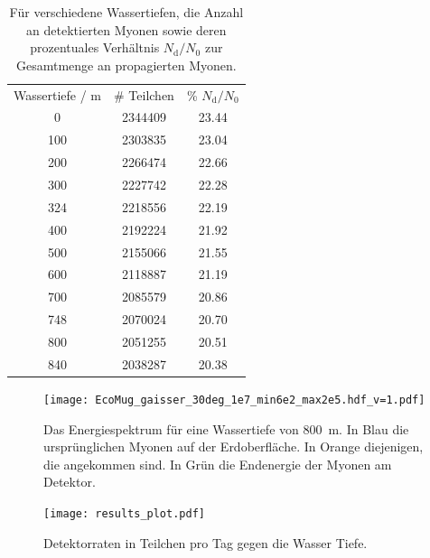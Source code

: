 \begin{table}[h]
    \caption{Für verschiedene Wassertiefen, die Anzahl an detektierten Myonen
     sowie deren prozentuales Verhältnis $N_\mathrm{d}/N_0$ zur Gesamtmenge an propagierten Myonen.}
    \centering\begin{tabular}{c c c}
        Wassertiefe / \si[]{m} & \# Teilchen &  \% $N_\mathrm{d}/N_0$ \\
        0   & \num{2344409} & \num{23.44} \\
        100 & \num{2303835} & \num{23.04} \\
        200 & \num{2266474} & \num{22.66} \\
        300 & \num{2227742} & \num{22.28} \\
        324 & \num{2218556} & \num{22.19} \\
        400 & \num{2192224} & \num{21.92} \\
        500 & \num{2155066} & \num{21.55} \\
        600 & \num{2118887} & \num{21.19} \\
        700 & \num{2085579} & \num{20.86} \\
        748 & \num{2070024} & \num{20.70} \\
        800 & \num{2051255} & \num{20.51} \\
        840 & \num{2038287} & \num{20.38} \\
    \end{tabular}
    \label{tab:wassertiefen_tabelle}
\end{table}

\begin{figure}[]
    \centering
    \texttt{[image: EcoMug\_gaisser\_30deg\_1e7\_min6e2\_max2e5.hdf\_v=1.pdf]}
    \caption{Das Energiespektrum für eine Wassertiefe von \SI[]{800}[]{m}.
        In Blau die ursprünglichen Myonen auf der Erdoberfläche.
        In Orange diejenigen, die angekommen sind. 
        In Grün die Endenergie der Myonen am Detektor.}
    \label{fig:pp_energiespekten}
\end{figure}


\begin{figure}[h]
    \centering
    \texttt{[image: results\_plot.pdf]}
    \caption{Detektorraten in Teilchen pro Tag gegen die 
    Wasser Tiefe.}
    \label{fig:results}
\end{figure}